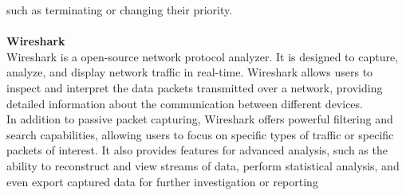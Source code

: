 such as terminating or changing their priority.\\
\\
\textbf{Wireshark}\\
Wireshark is a open-source network protocol analyzer.
It is designed to capture, analyze, and display network traffic in real-time.
Wireshark allows users to inspect and interpret the data packets transmitted over a network, providing detailed information
about the communication between different devices.\\
In addition to passive packet capturing, Wireshark offers powerful filtering and search capabilities,
allowing users to focus on specific types of traffic or specific packets of interest.
It also provides features for advanced analysis, such as the ability to reconstruct and view streams of data,
perform statistical analysis, and even export captured data for further investigation or reporting